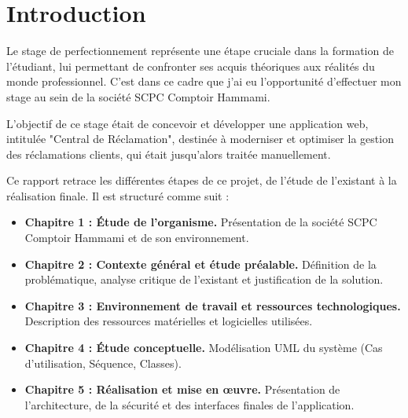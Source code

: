 \chapter*{Introduction}

Le stage de perfectionnement représente une étape cruciale dans la formation de l'étudiant, lui permettant de confronter ses acquis théoriques aux réalités du monde professionnel. C'est dans ce cadre que j'ai eu l'opportunité d'effectuer mon stage au sein de la société SCPC Comptoir Hammami.

L'objectif de ce stage était de concevoir et développer une application web, intitulée "Central de Réclamation", destinée à moderniser et optimiser la gestion des réclamations clients, qui était jusqu'alors traitée manuellement.

Ce rapport retrace les différentes étapes de ce projet, de l'étude de l'existant à la réalisation finale. Il est structuré comme suit :
\begin{itemize}
    \item \textbf{Chapitre 1 : Étude de l'organisme.} Présentation de la société SCPC Comptoir Hammami et de son environnement.
    \item \textbf{Chapitre 2 : Contexte général et étude préalable.} Définition de la problématique, analyse critique de l'existant et justification de la solution.
    \item \textbf{Chapitre 3 : Environnement de travail et ressources technologiques.} Description des ressources matérielles et logicielles utilisées.
    \item \textbf{Chapitre 4 : Étude conceptuelle.} Modélisation UML du système (Cas d'utilisation, Séquence, Classes).
    \item \textbf{Chapitre 5 : Réalisation et mise en œuvre.} Présentation de l'architecture, de la sécurité et des interfaces finales de l'application.
\end{itemize}
